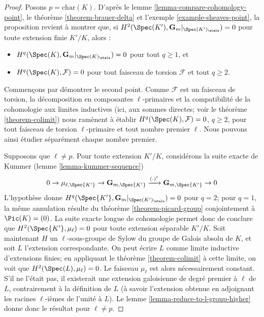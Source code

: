 \begin{proof}
Posons $p = \text{char}(K)$.
D'après le lemme \ref{lemma-compare-cohomology-point},
le théorème \ref{theorem-brauer-delta}
et l'exemple \ref{example-sheaves-point},
la proposition revient à montrer que, si
$H^2(\Spec(K'),\mathbf{G}_m|_{\Spec(K')_\etale}) = 0$
pour toute extension finie $K'/K$, alors :
\begin{itemize}
\item $H^q(\Spec(K),\mathbf{G}_m|_{\Spec(K)_\etale}) = 0$
pour tout $q \geq 1$, et
\item $H^q(\Spec(K),\mathcal{F}) = 0$
pour tout faisceau de torsion $\mathcal{F}$ et tout $q \geq 2$.
\end{itemize}
Commençons par démontrer le second point.
Comme $\mathcal{F}$ est un faisceau de torsion, la décomposition en
composantes $\ell$-primaires et la compatibilité de la cohomologie aux
limites inductives (ici, aux sommes directes; voir le théorème \ref{theorem-colimit})
nous ramènent à établir $H^q(\Spec(K),\mathcal{F}) = 0$, $q \geq 2$,
pour tout faisceau de torsion $\ell$-primaire et tout nombre premier $\ell$. Nous
pouvons ainsi étudier séparément chaque nombre premier.

\medskip\noindent
Supposons que $\ell \neq p$. Pour toute extension $K'/K$,
considérons la suite exacte de Kummer (lemme \ref{lemma-kummer-sequence})
$$
0 \to
\mu_{\ell, \Spec{K'}} \to
\mathbf{G}_{m, \Spec{K'}} \xrightarrow{(\cdot)^{\ell}}
\mathbf{G}_{m, \Spec{K'}} \to 0
$$
L'hypothèse donne $H^q(\Spec{K'},\mathbf{G}_m|_{\Spec(K')_\etale}) = 0$
pour $q = 2$; pour $q = 1$, la même annulation résulte du
théorème \ref{theorem-picard-group} conjointement à
$\Pic(K) = (0)$. La suite exacte longue de cohomologie
permet donc de conclure que $H^2(\Spec{K'}, \mu_\ell) = 0$ pour
toute extension séparable $K'/K$. Soit maintenant $H$ un $\ell$-sous-groupe de Sylow
du groupe de Galois absolu de $K$, et soit $L$ l'extension
correspondante. On peut écrire $L$ comme limite inductive d'extensions finies;
en appliquant le théorème \ref{theorem-colimit} à cette limite, on voit que
$H^2(\Spec(L), \mu_\ell) = 0$.
Le faisceau $\mu_\ell$ est alors nécessairement constant. S'il ne l'était pas, il
existerait une extension galoisienne de degré premier à
$\ell$ de $L$, contrairement à la définition de $L$ (à savoir l'extension
obtenue en adjoignant les racines $\ell$-ièmes de l'unité à $L$).
Le lemme \ref{lemma-reduce-to-l-group-higher}
donne donc le résultat pour $\ell \neq p$.


\end{proof}
